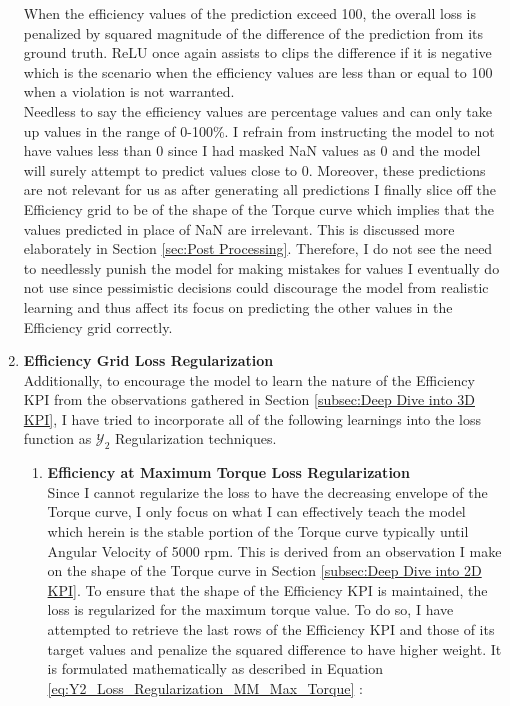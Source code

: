 \documentclass{report} %
\begin{document}
\begin{enumerate}
When the efficiency values of the prediction exceed 100, the overall loss is penalized by squared magnitude of the difference of the prediction from its ground truth.
\ac{ReLU} once again assists to clips the difference if it is negative which is the scenario when the efficiency values are less than or equal to 100 when a violation is not warranted. \\
Needless to say the efficiency values are percentage values and can only take up values in the range of 0-100\%.
I refrain from instructing the model to not have values less than 0 since I had masked \ac{NaN} values as 0 and the model will surely attempt to predict values close to 0.
Moreover, these predictions are not relevant for us as after generating all predictions I finally slice off the Efficiency grid to be of the shape of the Torque curve 
which implies that the values predicted in place of \ac{NaN} are irrelevant. This is discussed more elaborately in Section \ref{sec:Post Processing}.
Therefore, I do not see the need to needlessly punish the model for making mistakes for values I eventually do not use since pessimistic decisions could discourage the 
model from realistic learning and thus affect its focus on predicting the other values in the Efficiency grid correctly.
\item \textbf{Efficiency Grid Loss Regularization} \\
Additionally, to encourage the model to learn the nature of the Efficiency \ac{KPI} from the observations gathered in Section \ref{subsec:Deep Dive into 3D KPI}, I have 
tried to incorporate all of the following learnings into the loss function as $\mathcal{Y}_2$ Regularization techniques.
\begin{enumerate}
\item \textbf{Efficiency at Maximum Torque Loss Regularization} \\
Since I cannot regularize the loss to have the decreasing envelope of the Torque curve, I only focus on what I can effectively teach the model which 
herein is the stable portion of the Torque curve typically until Angular Velocity of 5000 rpm. This is derived from an observation I make on the shape of the Torque 
curve in Section \ref{subsec:Deep Dive into 2D KPI}.
To ensure that the shape of the Efficiency \ac{KPI} is maintained, the loss is regularized for the maximum torque value.
To do so, I have attempted to retrieve the last rows of the Efficiency \ac{KPI} and those of its target values and penalize the squared difference to have higher weight.
It is formulated mathematically as described in Equation \ref{eq:Y2_Loss_Regularization_MM_Max_Torque} :

\end{enumerate}
\end{enumerate}
\end{document}
